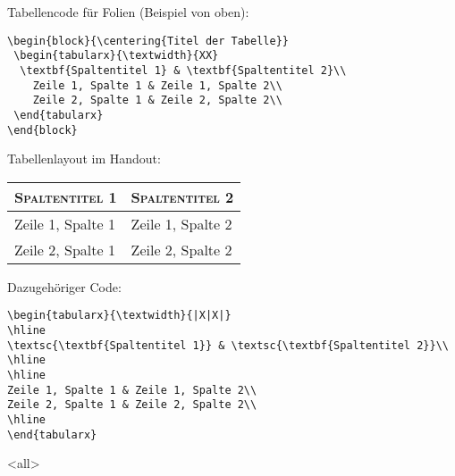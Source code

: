 \begin{frame}[fragile]
\pagebreak

Tabellencode für Folien (Beispiel von oben):

\begin{lstlisting}
\begin{block}{\centering{Titel der Tabelle}}
 \begin{tabularx}{\textwidth}{XX}
  \textbf{Spaltentitel 1} & \textbf{Spaltentitel 2}\\
    Zeile 1, Spalte 1 & Zeile 1, Spalte 2\\
    Zeile 2, Spalte 1 & Zeile 2, Spalte 2\\
 \end{tabularx}
\end{block}
\end{lstlisting}

Tabellenlayout im Handout:

\begin{tabularx}{\textwidth}{|X|X|}
\hline
\textsc{\textbf{Spaltentitel 1}} & \textsc{\textbf{Spaltentitel 2}}\\
\hline
\hline
Zeile 1, Spalte 1 & Zeile 1, Spalte 2\\
Zeile 2, Spalte 1 & Zeile 2, Spalte 2\\
\hline
\end{tabularx}

Dazugehöriger Code:

\begin{lstlisting}
\begin{tabularx}{\textwidth}{|X|X|}
\hline
\textsc{\textbf{Spaltentitel 1}} & \textsc{\textbf{Spaltentitel 2}}\\
\hline
\hline
Zeile 1, Spalte 1 & Zeile 1, Spalte 2\\
Zeile 2, Spalte 1 & Zeile 2, Spalte 2\\
\hline
\end{tabularx}
\end{lstlisting}

\mode
<all>

\end{frame}
\newpage


